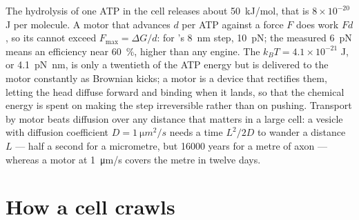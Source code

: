 \begin{proposition}\label{prop:b3:cytoskeleton-motility:physics}
The hydrolysis of one ATP in the cell releases about \qty{50}{kJ/mol},
that is $8\times 10^{-20}$ J per molecule. A motor that advances $d$
per ATP against a force $F$ does work $Fd$, so its \emph{}
cannot exceed $F_{\max} = \Delta G/d$: for 's \qty{8}{nm} step,
\qty{10}{pN}; the measured \qty{6}{pN} means an efficiency near
\qty{60}{\%}, higher than any engine. The  $k_{B}T =
4.1\times 10^{-21}$ J, or \qty{4.1}{pN.nm}, is only a twentieth of the
ATP energy but is delivered to the motor constantly as Brownian
kicks; a motor is a device that rectifies them, letting the head
diffuse forward and binding when it lands, so that the chemical energy
is spent on making the step irreversible rather than on pushing.
Transport by motor beats diffusion over any distance that matters in
a large cell: a vesicle with diffusion coefficient $D = \qty{1}{\micro
m^2/s}$ needs a time $L^{2}/2D$ to wander a distance $L$ --- half a
second for a micrometre, but \num{16000} years for a metre of axon ---
whereas a motor at \qty{1}{\micro m/s} covers the metre in twelve days.
\end{proposition}
\admitted

\section{How a cell crawls}


